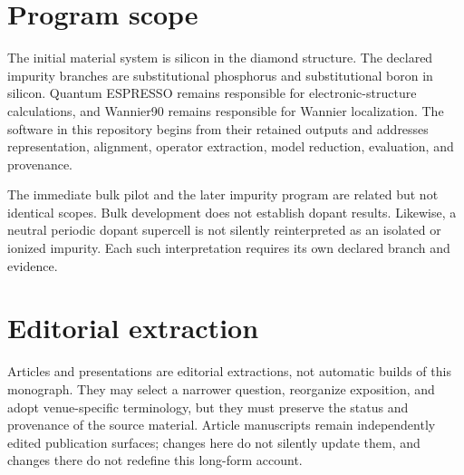 \section{Program scope}

The initial material system is silicon in the diamond structure. The declared
impurity branches are substitutional phosphorus and substitutional boron in
silicon. Quantum ESPRESSO remains responsible for electronic-structure
calculations, and Wannier90 remains responsible for Wannier localization. The
software in this repository begins from their retained outputs and addresses
representation, alignment, operator extraction, model reduction, evaluation,
and provenance.

The immediate bulk pilot and the later impurity program are related but not
identical scopes. Bulk development does not establish dopant results. Likewise,
a neutral periodic dopant supercell is not silently reinterpreted as an isolated
or ionized impurity. Each such interpretation requires its own declared branch
and evidence.

\section{Editorial extraction}

Articles and presentations are editorial extractions, not automatic builds of
this monograph. They may select a narrower question, reorganize exposition, and
adopt venue-specific terminology, but they must preserve the status and
provenance of the source material. Article manuscripts remain independently
edited publication surfaces; changes here do not silently update them, and
changes there do not redefine this long-form account.
